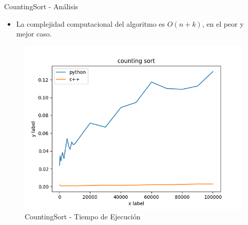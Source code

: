 \documentclass[11pt]{beamer}
\begin{document}
		\begin{frame}{CountingSort - Análisis}
            \begin{itemize}
                \item La complejidad computacional del algoritmo es $O(n+k)$, en el peor y mejor caso.
            \end{itemize}
            \begin{figure}[H]
                \centering
                \includegraphics[scale=0.5]{img/counting_diagram.png}
                \caption{CountingSort - Tiempo de Ejecución}
                \label{fig:counting_diagram}
            \end{figure}
            
		\end{frame}
\end{document}
